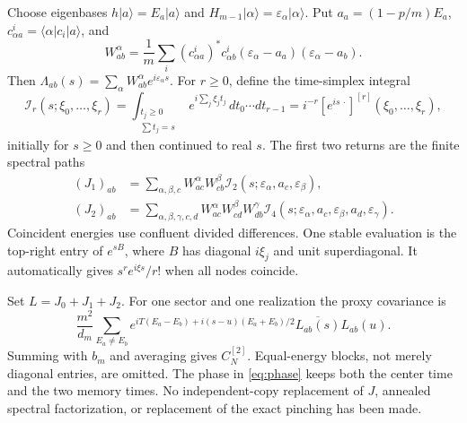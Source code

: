 \documentclass[11pt,a4paper]{article}
\begin{document}
Choose eigenbases $h|a\rangle=E_a|a\rangle$ and
$H_{m-1}|\alpha\rangle=\varepsilon_\alpha|\alpha\rangle$.
Put $a_a=(1-p/m)E_a$, $c^i_{\alpha a}=\langle\alpha|c_i|a\rangle$, and
\begin{equation}
 W^\alpha_{ab}=\frac1m\sum_i(c^i_{\alpha a})^*c^i_{\alpha b}
 (\varepsilon_\alpha-a_a)(\varepsilon_\alpha-a_b).
\end{equation}
Then $\Lambda_{ab}(s)=\sum_\alpha W^\alpha_{ab}e^{i\varepsilon_\alpha s}$.
For $r\geq0$, define the time-simplex integral
\begin{equation}
 \mathcal I_r(s;\xi_0,\ldots,\xi_r)=
 \int_{\substack{t_j\geq0\\\sum t_j=s}}
 e^{i\sum_j\xi_jt_j}\,dt_0\cdots dt_{r-1}
 =i^{-r}[e^{is\,\cdot}]^{[r]}(\xi_0,\ldots,\xi_r),\label{eq:simplex}
\end{equation}
initially for $s\geq0$ and then continued to real $s$.
The first two returns are the finite spectral paths
\begin{align}
 (J_1)_{ab}&=\sum_{\alpha,\beta,c}W^\alpha_{ac}W^\beta_{cb}
 \mathcal I_2(s;\varepsilon_\alpha,a_c,\varepsilon_\beta),\\
 (J_2)_{ab}&=\sum_{\alpha,\beta,\gamma,c,d}
 W^\alpha_{ac}W^\beta_{cd}W^\gamma_{db}
 \mathcal I_4(s;\varepsilon_\alpha,a_c,\varepsilon_\beta,a_d,
 \varepsilon_\gamma).
\end{align}
Coincident energies use confluent divided differences.
One stable evaluation is the top-right entry of $e^{sB}$,
where $B$ has diagonal $i\xi_j$ and unit superdiagonal. It
automatically gives $s^re^{i\xi s}/r!$ when all nodes coincide.

Set $L=J_0+J_1+J_2$. For one sector and one realization the
proxy covariance is
\begin{equation}
 \frac{m^2}{d_m}\sum_{E_a\ne E_b}
 e^{iT(E_a-E_b)+i(s-u)(E_a+E_b)/2}
 \overline{L_{ab}(s)}L_{ab}(u).\label{eq:phase}
\end{equation}
Summing with $b_m$ and averaging gives $C_N^{[2]}$. Equal-energy
blocks, not merely diagonal entries, are omitted. The phase in
\eqref{eq:phase} keeps both the center time and the two memory times.
No independent-copy replacement of $J$, annealed spectral factorization,
or replacement of the exact pinching has been made.

\newpage
\end{document}
